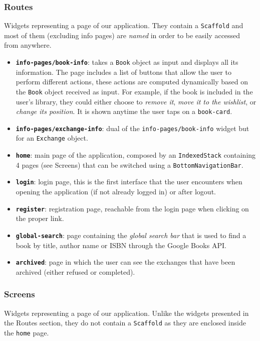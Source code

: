\subsubsection{Routes}
Widgets representing a page of our application.
They contain a \texttt{Scaffold} and most of them (excluding info pages) are \textit{named} in order to be easily accessed from anywhere.

\begin{itemize}
      \item \textbf{\texttt{info-pages/book-info}}:
            takes a \texttt{Book} object as input and displays all its information.
            The page includes a list of buttons that allow the user to perform different actions, these actions are computed dynamically based on the \texttt{Book} object received as input.
            For example, if the book is included in the user's library, they could either choose to \textit{remove it}, \textit{move it to the wishlist}, or \textit{change its position}.
            It is shown anytime the user taps on a \texttt{book-card}.
      \item \textbf{\texttt{info-pages/exchange-info}}:
            dual of the \texttt{info-pages/book-info} widget but for an \texttt{Exchange} object.
      \item \textbf{\texttt{home}}:
            main page of the application, composed by an \texttt{IndexedStack} containing 4 pages (see Screens) that can be switched using a \texttt{BottomNavigationBar}.
      \item \textbf{\texttt{login}}:
            login page, this is the first interface that the user encounters when opening the application (if not already logged in) or after logout.
      \item \textbf{\texttt{register}}:
            registration page, reachable from the login page when clicking on the proper link.
      \item \textbf{\texttt{global-search}}:
            page containing the \textit{global search bar} that is used to find a book by title, author name or ISBN through the Google Books API.
      \item \textbf{\texttt{archived}}:
            page in which the user can see the exchanges that have been archived (either refused or completed).
\end{itemize}

\clearpage
\subsubsection{Screens}
\label{screens}
Widgets representing a page of our application.
Unlike the widgets presented in the Routes section, they do not contain a \texttt{Scaffold} as they are enclosed inside the \texttt{home} page.

